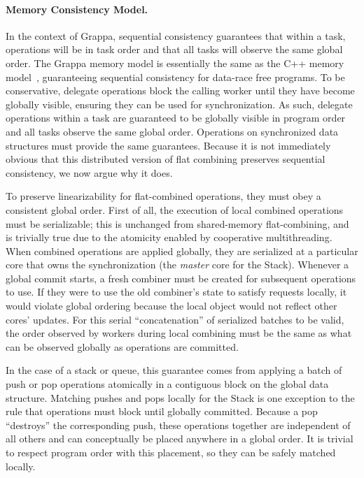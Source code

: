\paragraph{Memory Consistency Model.}
\label{sec:memory-model}
In the context of Grappa, sequential consistency guarantees that within a
task, operations will be in task order and that all tasks will observe the
same global order.
The Grappa memory model is essentially the same as the C++ memory
model~\cite{boehm:drf0,N2480,N2800}, guaranteeing sequential
consistency for data-race free programs. To be conservative, delegate
operations block the calling worker until they have become globally visible,
ensuring they can be used for synchronization. As such, delegate operations
within a task are guaranteed to be globally visible in program order and all
tasks observe the same global order.
Operations on synchronized data structures must provide the same guarantees.
Because it is not immediately obvious
that this distributed version of flat combining preserves sequential
consistency, we now argue why it does.

To preserve linearizability for flat-combined operations, they must obey a consistent global order.
First of all, the execution of local combined operations must be serializable;
this is unchanged from shared-memory flat-combining, and is trivially true due to the atomicity enabled by cooperative multithreading.
When combined operations are applied globally, they are serialized at a particular core that owns the synchronization (the \emph{master} core for the Stack).
Whenever a global commit starts, a fresh combiner must be created for subsequent operations to use. If they were to use the old combiner's state to satisfy requests locally, it would violate global ordering because the local object would not reflect other cores' updates.
For this serial ``concatenation'' of serialized batches to be valid, the order observed by workers during local combining must be the same as what can be observed globally as operations are committed.

In the case of a stack or queue, this guarantee comes from applying a batch of push or pop operations atomically in a contiguous block on the global data structure.
Matching pushes and pops locally for the Stack is one exception to the rule that operations must block until globally committed. Because a pop ``destroys'' the corresponding push, these operations together are independent of all others and can conceptually be placed anywhere in a global order. It is trivial to respect program order with this placement, so they can be safely matched locally.

